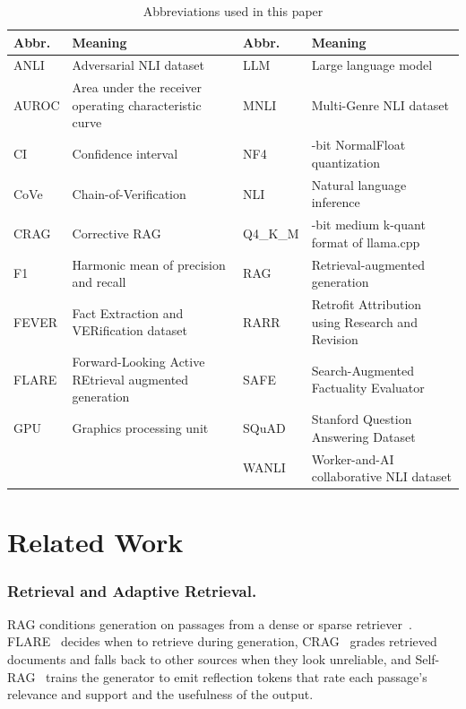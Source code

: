 \documentclass{svproc}
\begin{document}
\begin{table}[htb]
\caption{Abbreviations used in this paper}
\label{tab:abbr}
\centering
\footnotesize
\setlength{\tabcolsep}{3pt}
\begin{tabular}{@{}l>{\raggedright\arraybackslash}p{4.55cm}l>{\raggedright\arraybackslash}p{4.55cm}@{}}
\toprule
Abbr. & Meaning & Abbr. & Meaning \\
\midrule
ANLI & Adversarial NLI dataset & LLM & Large language model \\
AUROC & Area under the receiver operating characteristic curve & MNLI & Multi-Genre NLI dataset \\
CI & Confidence interval & NF4 & 4-bit NormalFloat quantization \\
CoVe & Chain-of-Verification & NLI & Natural language inference \\
CRAG & Corrective RAG & Q4\_K\_M & 4-bit medium k-quant format of llama.cpp \\
F1 & Harmonic mean of precision and recall & RAG & Retrieval-augmented generation \\
FEVER & Fact Extraction and VERification dataset & RARR & Retrofit Attribution using Research and Revision \\
FLARE & Forward-Looking Active REtrieval augmented generation & SAFE & Search-Augmented Factuality Evaluator \\
GPU & Graphics processing unit & SQuAD & Stanford Question Answering Dataset \\
 & & WANLI & Worker-and-AI collaborative NLI dataset \\
\bottomrule
\end{tabular}
\end{table}

\section{Related Work}
\subsubsection{Retrieval and Adaptive Retrieval.} RAG conditions generation on passages from a dense or sparse retriever~\cite{lewis2020rag,gao2023ragsurvey}. FLARE~\cite{jiang2023flare} decides when to retrieve during generation, CRAG~\cite{yan2024crag} grades retrieved documents and falls back to other sources when they look unreliable, and Self-RAG~\cite{asai2023selfrag} trains the generator to emit reflection tokens that rate each passage's relevance and support and the usefulness of the output.
\end{document}
